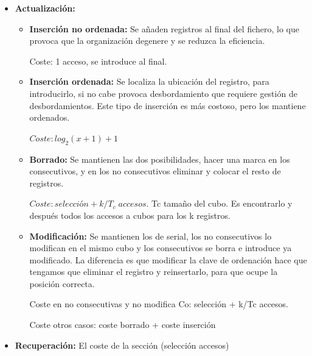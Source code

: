 \documentclass[12pt, twoside, openright]{report} %
\begin{document}
\begin{itemize}
\begin{itemize}
      \begin{itemize}
      \item \textbf{Actualización:}
        

        \begin{itemize}
        \item \textbf{Inserción no ordenada:} Se añaden registros al final
          del fichero, lo que provoca que la organización degenere y se
          reduzca la eficiencia.
          

        
		  
            Coste: 1 acceso, se introduce al final.
           
			
        \item \textbf{Inserción ordenada:} Se localiza la ubicación del
          registro, para introducirlo, si no cabe provoca desbordamiento
          que requiere gestión de desbordamientos. Este tipo de
          inserción es más costoso, pero los mantiene ordenados.
          

         
		  
            $Coste: log_2(x+1) +1$
            
			
        \item \textbf{Borrado:} Se mantienen las dos posibilidades, hacer
          una marca en los consecutivos, y en los no consecutivos
          eliminar y colocar el resto de registros.
          

         
		  
            $Coste: selección + k/T_c \; accesos$. Tc tamaño del cubo. Es
            encontrarlo y después todos los accesos a cubos para los k
            registros.
         
			
        \item \textbf{Modificación:} Se mantienen los de serial, los no
          consecutivos lo modifican en el mismo cubo y los consecutivos
          se borra e introduce ya modificado. La diferencia es que
          modificar la clave de ordenación hace que tengamos que
          eliminar el registro y reinsertarlo, para que ocupe la
          posición correcta.
          

         
		  
            Coste en no consecutivas y no modifica Co: selección + k/Tc
            accesos.
           
			
            Coste otros casos: coste borrado + coste inserción
           
			
        \end{itemize}
      \item \textbf{Recuperación:} El coste de la sección (selección
        accesos)
        

\end{itemize}
\end{itemize}
\end{itemize}
\end{document}
